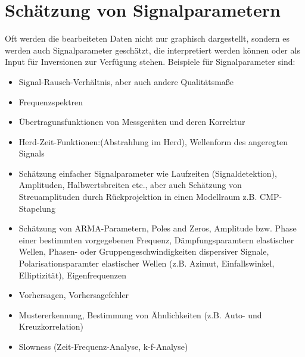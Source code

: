 \section{Schätzung von Signalparametern}
Oft werden die bearbeiteten Daten nicht nur graphisch dargestellt, sondern es werden auch Signalparameter geschätzt, die interpretiert werden können oder als Input für Inversionen zur Verfügung stehen. Beispiele für Signalparameter sind:
\begin{itemize}
\item Signal-Rausch-Verhältnis, aber auch andere Qualitätsmaße
\item Frequenzspektren
\item Übertragunsfunktionen von Messgeräten und deren Korrektur
\item Herd-Zeit-Funktionen:(Abstrahlung im Herd), Wellenform des angeregten Signals
\item Schätzung einfacher Signalparameter wie Laufzeiten (Signaldetektion), Amplituden, Halbwertsbreiten etc., aber auch Schätzung von Streuamplituden durch Rückprojektion in einen Modellraum z.B. CMP-Stapelung
\item Schätzung von ARMA-Parametern, Poles and Zeros, Amplitude bzw. Phase einer bestimmten vorgegebenen Frequenz, Dämpfungsparamtern elastischer Wellen, Phasen- oder Gruppengeschwindigkeiten dispersiver Signale, Polarisationsparamter elastischer Wellen (z.B. Azimut, Einfallswinkel, Elliptizität), Eigenfrequenzen
\item Vorhersagen, Vorhersagefehler
\item Mustererkennung, Bestimmung von Ähnlichkeiten (z.B. Auto- und Kreuzkorrelation)
\item Slowness (Zeit-Frequenz-Analyse, k-f-Analyse)
  \end{itemize}


